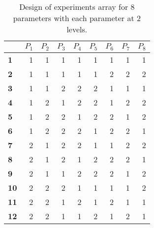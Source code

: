 \begin{table}[tb]
\centering
\caption{Design of experiments array for 8 parameters with each parameter at 2 levels.}
\label{tab:L12}
\begin{tabular}{lrrrrrrrr}
\toprule
{} & $P_1$ & $P_2$ & $P_3$ & $P_4$ & $P_5$ & $P_6$ & $P_7$ & $P_8$ \\
\midrule
\textbf{1 } &     1 &     1 &     1 &     1 &     1 &     1 &     1 &     1 \\
\textbf{2 } &     1 &     1 &     1 &     1 &     1 &     2 &     2 &     2 \\
\textbf{3 } &     1 &     1 &     2 &     2 &     2 &     1 &     1 &     1 \\
\textbf{4 } &     1 &     2 &     1 &     2 &     2 &     1 &     2 &     2 \\
\textbf{5 } &     1 &     2 &     2 &     1 &     2 &     2 &     1 &     2 \\
\textbf{6 } &     1 &     2 &     2 &     2 &     1 &     2 &     2 &     1 \\
\textbf{7 } &     2 &     1 &     2 &     2 &     1 &     1 &     2 &     2 \\
\textbf{8 } &     2 &     1 &     2 &     1 &     2 &     2 &     2 &     1 \\
\textbf{9 } &     2 &     1 &     1 &     2 &     2 &     2 &     1 &     2 \\
\textbf{10} &     2 &     2 &     2 &     1 &     1 &     1 &     1 &     2 \\
\textbf{11} &     2 &     2 &     1 &     2 &     1 &     2 &     1 &     1 \\
\textbf{12} &     2 &     2 &     1 &     1 &     2 &     1 &     2 &     1 \\
\bottomrule
\end{tabular}
\end{table}
